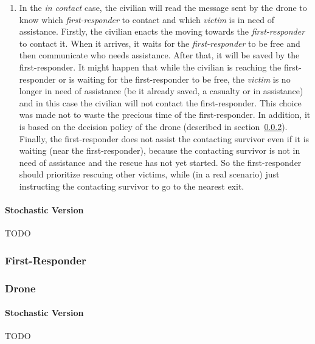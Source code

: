\begin{enumerate}
\begin{enumerate}
		\item In the \textit{in contact} case, the civilian will read the message sent by the drone to know which \textit{first-responder} to contact and which \textit{victim} is in need of assistance. Firstly, the civilian enacts the moving towards the \textit{first-responder} to contact it. When it arrives, it waits for the \textit{first-responder} to be free and then communicate who needs assistance. After that, it will be saved by the first-responder.\newline
		It might happen that while the civilian is reaching the first-responder or is waiting for the first-responder to be free, the \textit{victim} is no longer in need of assistance (be it already saved, a casualty or in assistance) and in this case the civilian will not contact the first-responder. This choice was made not to waste the precious time of the first-responder. In addition, it is based on the decision policy of the drone (described in section~\ref{sec:drone}). Finally, the first-responder does not assist the contacting survivor even if it is waiting (near the first-responder), because the contacting survivor is not in need of assistance and the rescue has not yet started. So the first-responder should prioritize rescuing other victims, while (in a real scenario) just instructing the contacting survivor to go to the nearest exit.
	\end{enumerate}
\end{enumerate}


\paragraph{Stochastic Version}
TODO

\subsubsection{First-Responder}


\subsubsection{Drone}
\label{sec:drone}

\paragraph{Stochastic Version}
TODO


